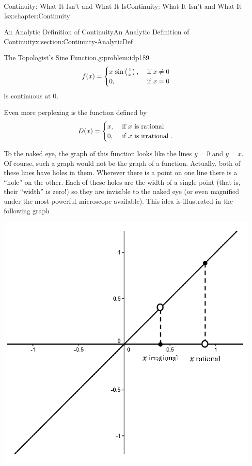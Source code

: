 \begin{chapterptx}{Continuity: What It Isn't and What It Is}{}{Continuity: What It Isn't and What It Is}{}{}{x:chapter:Continuity}
\begin{sectionptx}{An Analytic Definition of Continuity}{}{An Analytic Definition of Continuity}{}{}{x:section:Continuity-AnalyticDef}
\begin{problem}{The Topologist's Sine Function.}{g:problem:idp189}
\begin{equation*}
				f(x)= \begin{cases}x\,\sin\left(\frac{1}{x}\right),& \text{ if } x\neq 0\\ 0\text{,} & \text{ if } x=0 \end{cases}
			\end{equation*}
			is continuous at \(0\).%
		\end{problem}
		Even more perplexing is the function defined by%
		\begin{equation*}
			D(x)= \begin{cases}
				x, & \text{ if } x\text{ is rational } \\
				0, & \text{ if } x\text{ is irrational } . 
			\end{cases} 
		\end{equation*}
		\par
		To the naked eye, the graph of this function looks like the lines \(y=0\) and \(y=x\).  Of course, such a graph would not be the graph of a function.  Actually, both of these lines have holes in them.  Wherever there is a point on one line there is a ``hole'' on the other.  Each of these holes are the width of a single point (that is, their ``width'' is zero!) so they are invisible to the naked eye (or even magnified under the most powerful microscope available).  This idea is illustrated in the following graph%
		\begin{image}{0.2}{0.6}{0.2}%
			\includegraphics[width=\linewidth]{external/images/Ch5fig5.png}

\end{image}
\end{sectionptx}
\end{chapterptx}
